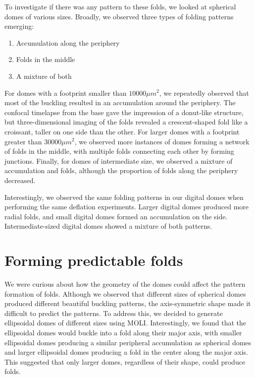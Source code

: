 To investigate if there was any pattern to these folds, we looked at
spherical domes of various sizes. Broadly, we observed three types of
folding patterns emerging:

\begin{enumerate}
	\def\labelenumi{\arabic{enumi}.}
	\item
	Accumulation along the periphery
	\item
	Folds in the middle
	\item
	A mixture of both
\end{enumerate}

For domes with a footprint smaller than \(10000 \mu m^2\), we repeatedly
observed that most of the buckling resulted in an accumulation around
the periphery. The confocal timelapse from the base gave the impression
of a donut-like structure, but three-dimensional imaging of the folds
revealed a crescent-shaped fold like a croissant, taller on one side
than the other. For larger domes with a footprint greater than
\(30000\mu m^2\), we observed more instances of domes forming a network
of folds in the middle, with multiple folds connecting each other by
forming junctions. Finally, for domes of intermediate size, we observed
a mixture of accumulation and folds, although the proportion of folds
along the periphery decreased.

Interestingly, we observed the same folding patterns in our digital
domes when performing the same deflation experiments. Larger digital
domes produced more radial folds, and small digital domes formed an
accumulation on the side. Intermediate-sized digital domes showed a
mixture of both patterns.

\hypertarget{forming-predictable-folds}{%
	\section{Forming predictable folds}\label{forming-predictable-folds}}

We were curious about how the geometry of the domes could affect the
pattern formation of folds. Although we observed that different sizes of
spherical domes produced different beautiful buckling patterns, the
axis-symmetric shape made it difficult to predict the patterns. To
address this, we decided to generate ellipsoidal domes of different
sizes using MOLI. Interestingly, we found that the ellipsoidal domes
would buckle into a fold along their major axis, with smaller
ellipsoidal domes producing a similar peripheral accumulation as
spherical domes and larger ellipsoidal domes producing a fold in the
center along the major axis. This suggested that only larger domes,
regardless of their shape, could produce folds.

